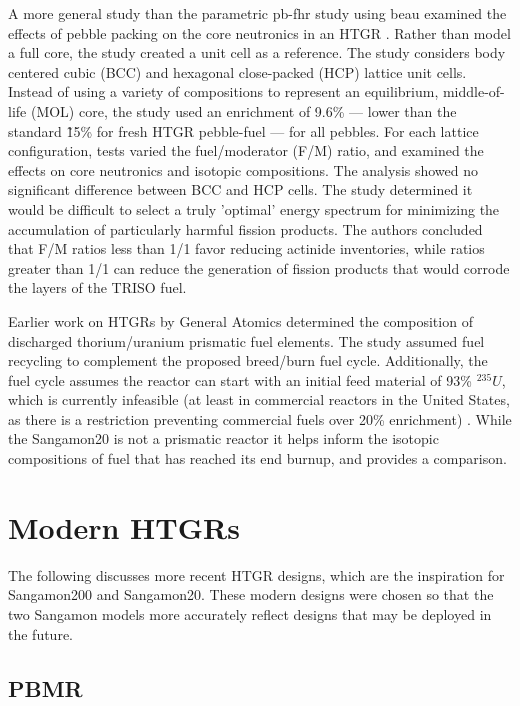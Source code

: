 A more general study than the parametric \acrshort{pb-fhr} study using \acrshort{beau} examined the effects of pebble packing on the core neutronics in an HTGR \cite{turkmen_effect_2012}.  Rather than model a full core, the study created a unit cell as a reference.  The study considers body centered cubic (BCC) and hexagonal close-packed (HCP) lattice unit cells.  Instead of using a variety of compositions to represent an equilibrium, middle-of-life (MOL) core, the study used an enrichment of 9.6\%  --- lower than the standard \~15\% for fresh HTGR pebble-fuel --- for all pebbles.  For each lattice configuration, tests varied the fuel/moderator (F/M) ratio, and examined the effects on core neutronics and isotopic compositions.  The analysis showed no significant difference between BCC and HCP cells.  The study determined it would be difficult to select a truly 'optimal' energy spectrum for minimizing the accumulation of particularly harmful fission products.  The authors concluded that F/M ratios less than 1/1 favor reducing actinide inventories, while ratios greater than 1/1 can reduce the generation of fission products that would corrode the layers of the TRISO fuel.

Earlier work on HTGRs by General Atomics determined the composition of discharged thorium/uranium prismatic fuel elements.  The study assumed fuel recycling to complement the proposed breed/burn fuel cycle.  Additionally, the fuel cycle assumes the reactor can start with an initial feed material of 93\% $^{235}U$, which is currently infeasible (at least in commercial reactors in the United States, as there is a restriction preventing commercial fuels over 20\% enrichment) \cite{hamilton_htgr_1976}.  While the Sangamon20 is not a prismatic reactor it helps inform the isotopic compositions of fuel that has reached its end burnup, and provides a comparison.


\section{Modern HTGRs}
\label{sec:modern}

The following discusses more recent HTGR designs, which are the inspiration for Sangamon200 and Sangamon20.  These modern designs were chosen so that the two Sangamon models more accurately reflect designs that may be deployed in the future.

\subsection{PBMR}

